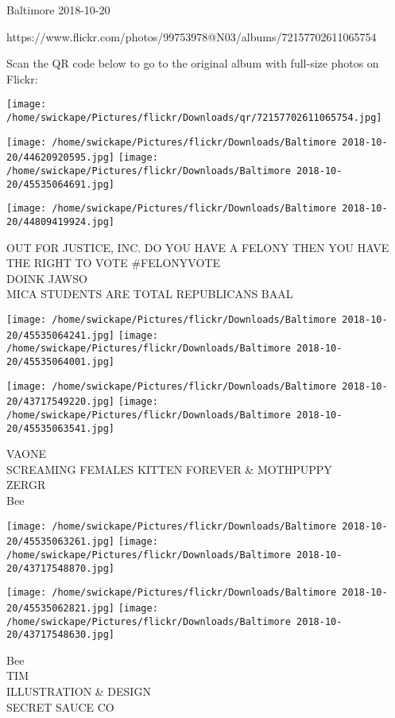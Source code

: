 \documentclass[10pt,letterpaper]{article}
\begin{document}
Baltimore 2018-10-20

https://www.flickr.com/photos/99753978@N03/albums/72157702611065754

Scan the QR code below to go to the original album with full-size photos on Flickr:

\texttt{[image: /home/swickape/Pictures/flickr/Downloads/qr/72157702611065754.jpg]}
\pagebreak

\texttt{[image: /home/swickape/Pictures/flickr/Downloads/Baltimore 2018-10-20/44620920595.jpg]}
\texttt{[image: /home/swickape/Pictures/flickr/Downloads/Baltimore 2018-10-20/45535064691.jpg]}

\vspace{0.25in}
\texttt{[image: /home/swickape/Pictures/flickr/Downloads/Baltimore 2018-10-20/44809419924.jpg]}

OUT FOR JUSTICE, INC. DO YOU HAVE A FELONY THEN YOU HAVE THE RIGHT TO VOTE \#FELONYVOTE\\
DOINK JAWSO\\
MICA STUDENTS ARE TOTAL REPUBLICANS BAAL\\
\pagebreak

\texttt{[image: /home/swickape/Pictures/flickr/Downloads/Baltimore 2018-10-20/45535064241.jpg]}
\texttt{[image: /home/swickape/Pictures/flickr/Downloads/Baltimore 2018-10-20/45535064001.jpg]}

\texttt{[image: /home/swickape/Pictures/flickr/Downloads/Baltimore 2018-10-20/43717549220.jpg]}
\texttt{[image: /home/swickape/Pictures/flickr/Downloads/Baltimore 2018-10-20/45535063541.jpg]}

VAONE\\
SCREAMING FEMALES KITTEN FOREVER \& MOTHPUPPY\\
ZERGR\\
Bee\\
\pagebreak

\texttt{[image: /home/swickape/Pictures/flickr/Downloads/Baltimore 2018-10-20/45535063261.jpg]}
\texttt{[image: /home/swickape/Pictures/flickr/Downloads/Baltimore 2018-10-20/43717548870.jpg]}

\texttt{[image: /home/swickape/Pictures/flickr/Downloads/Baltimore 2018-10-20/45535062821.jpg]}
\texttt{[image: /home/swickape/Pictures/flickr/Downloads/Baltimore 2018-10-20/43717548630.jpg]}

Bee\\
TIM\\
ILLUSTRATION \& DESIGN\\
SECRET SAUCE CO\\
\pagebreak
\end{document}
